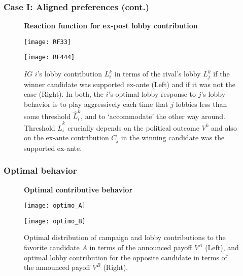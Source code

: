 \documentclass[handout,final,xcolor=dvipsnames]{beamer}
\begin{document}
    \begin{frame}\frametitle{Case I: Aligned preferences (cont.)}
\begin{figure}[ht]
\vspace{ 4 mm}
\begin{center}
\textbf{Reaction function for ex-post lobby contribution}
\end{center}
\begin{minipage}[b]{0.45\linewidth}
\texttt{[image: RF33]}
\end{minipage}
\begin{minipage}[b]{0.45\linewidth}
\texttt{[image: RF444]}
\end{minipage}
  \caption{\scriptsize $IG$ $i$'s lobby contribution $L^{k}_{i}$ in terms of the rival's lobby $L^{k}_{j}$ if the winner candidate was supported ex-ante (Left) and if it was not the case (Right). In both, the $i$'s optimal lobby response to $j$'s lobby behavior is to play aggressively each time that $j$ lobbies less than some threshold $\hat{L}^k_i$, and to `accommodate' the other way around. Threshold $\hat{L}^k_i$ crucially depends on the political outcome $V^k$ and also on the ex-ante contribution $C_j$ in the winning candidate was the supported ex-ante.}
\vspace{5 mm}
\end{figure}
  \end{frame}




   \begin{frame}\frametitle{Optimal behavior}
\begin{figure}[ht]
\vspace{ 4 mm}
\begin{center}
\textbf{Optimal contributive behavior}
\end{center}
\begin{minipage}[b]{0.45\linewidth}
\texttt{[image: optimo\_A]}
\end{minipage}
\begin{minipage}[b]{0.45\linewidth}
\texttt{[image: optimo\_B]}
\end{minipage}
  \caption{\scriptsize Optimal distribution of campaign and lobby contributions to the favorite candidate $A$ in terms of the announced payoff $V^A$ (Left), and optimal lobby contribution for the opposite candidate in terms of the announced payoff $V^B$ (Right).}
\end{figure}

  \end{frame}
\end{document}
